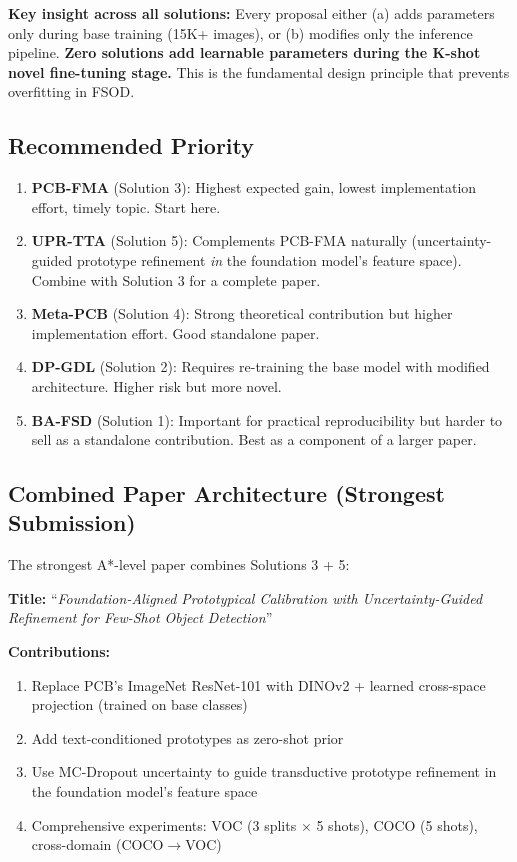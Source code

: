 \documentclass[11pt,a4paper]{article}
\begin{document}
\textbf{Key insight across all solutions:} Every proposal either (a) adds parameters only during base training (15K+ images), or (b) modifies only the inference pipeline. \textbf{Zero solutions add learnable parameters during the K-shot novel fine-tuning stage.} This is the fundamental design principle that prevents overfitting in FSOD.

\subsection{Recommended Priority}

\begin{enumerate}
    \item \textbf{PCB-FMA} (Solution 3): Highest expected gain, lowest implementation effort, timely topic. Start here.
    \item \textbf{UPR-TTA} (Solution 5): Complements PCB-FMA naturally (uncertainty-guided prototype refinement \textit{in} the foundation model's feature space). Combine with Solution 3 for a complete paper.
    \item \textbf{Meta-PCB} (Solution 4): Strong theoretical contribution but higher implementation effort. Good standalone paper.
    \item \textbf{DP-GDL} (Solution 2): Requires re-training the base model with modified architecture. Higher risk but more novel.
    \item \textbf{BA-FSD} (Solution 1): Important for practical reproducibility but harder to sell as a standalone contribution. Best as a component of a larger paper.
\end{enumerate}

\subsection{Combined Paper Architecture (Strongest Submission)}

The strongest A*-level paper combines Solutions 3 + 5:

\textbf{Title:} ``\textit{Foundation-Aligned Prototypical Calibration with Uncertainty-Guided Refinement for Few-Shot Object Detection}''

\textbf{Contributions:}
\begin{enumerate}
    \item Replace PCB's ImageNet ResNet-101 with DINOv2 + learned cross-space projection (trained on base classes)
    \item Add text-conditioned prototypes as zero-shot prior
    \item Use MC-Dropout uncertainty to guide transductive prototype refinement in the foundation model's feature space
    \item Comprehensive experiments: VOC (3 splits $\times$ 5 shots), COCO (5 shots), cross-domain (COCO$\rightarrow$VOC)
\end{enumerate}
\end{document}
